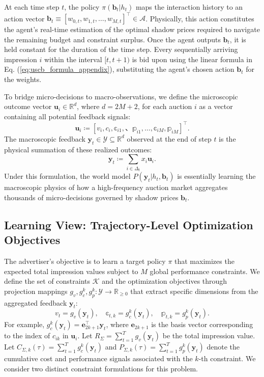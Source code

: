 \documentclass[sigconf, anonymous, review]{acmart}
\begin{document}
At each time step $t$, the policy $\pi(\mathbf{b}_t | h_t)$ maps the interaction history to an action vector $\mathbf{b}_t \equiv [w_{0,t}, w_{1,t}, \dots, w_{M,t}]^\top \in \mathcal{A}$. Physically, this action constitutes the agent's real-time estimation of the optimal shadow prices required to navigate the remaining budget and constraint surplus. Once the agent outputs $\mathbf{b}_t$, it is held constant for the duration of the time step. Every sequentially arriving impression $i$ within the interval $[t, t+1)$ is bid upon using the linear formula in Eq. (\ref{eq:uscb_formula_appendix}), substituting the agent's chosen action $\mathbf{b}_t$ for the weights. 

To bridge micro-decisions to macro-observations, we define the microscopic outcome vector $\mathbf{u}_i \in \mathbb{R}^d$, where $d=2M+2$, for each auction $i$ as a vector containing all potential feedback signals:
\begin{equation}
    \mathbf{u}_i \coloneqq [v_i, c_i, \mathbb{c}_{i1}, 、\mathbb{p}_{i1}, \dots, \mathbb{c}_{iM}, \mathbb{p}_{iM}]^\top.
\end{equation}
The macroscopic feedback $\mathbf{y}_t \in \mathcal{Y} \subseteq \mathbb{R}^d$ observed at the end of step $t$ is the physical summation of these realized outcomes:
\begin{equation}
    \mathbf{y}_t \coloneqq \sum_{i \in \Delta_t} x_i \mathbf{u}_i.
\end{equation}
Under this formulation, the world model $P(\mathbf{y}_t | h_t, \mathbf{b}_t)$ is essentially learning the macroscopic physics of how a high-frequency auction market aggregates thousands of micro-decisions governed by shadow prices $\mathbf{b}_t$.

\subsection{Learning View: Trajectory-Level Optimization Objectives}
\label{app:learn_view}

The advertiser's objective is to learn a target policy $\pi$ that maximizes the expected total impression values subject to $M$ global performance constraints.
We define the set of constraints $\mathcal{K}$ and the optimization objectives through projection mappings $g_v, g_c^k, g_p^k: \mathcal{Y} \to \mathbb{R}_{\ge 0}$ that extract specific dimensions from the aggregated feedback $\mathbf{y}_t$:
\begin{equation}
    v_t = g_v(\mathbf{y}_t), \quad \mathbb{c}_{t,k} = g_c^k(\mathbf{y}_t), \quad \mathbb{p}_{t,k} = g_p^k(\mathbf{y}_t).
\end{equation}
For example, $g_c^k(\mathbf{y}_t) = \mathbf{e}_{2k+1}^\top \mathbf{y}_t$, where $\mathbf{e}_{2k+1}$ is the basis vector corresponding to the index of $c_{ik}$ in $\mathbf{u}_i$.
Let $R_{\Sigma}=\sum_{t=1}^T g_v(\mathbf{y}_t)$ be the total impression value. Let $C_{\Sigma, k}(\tau) = \sum_{t=1}^T g_c^k(\mathbf{y}_t)$ and $P_{\Sigma, k}(\tau) = \sum_{t=1}^T g_p^k(\mathbf{y}_t)$ denote the cumulative cost and performance signals associated with the $k$-th constraint. We consider two distinct constraint formulations for this problem.
\end{document}
